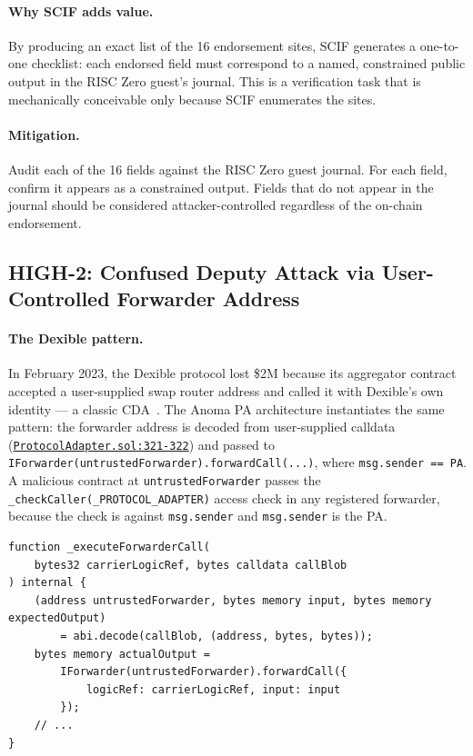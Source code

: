 \documentclass[11pt,a4paper]{article}
\newcommand{\paRepoRoot}{https://github.com/anoma/pa-evm/blob/main/contracts/src}
\newcommand{\parefR}[3]{\href{\paRepoRoot/#1\#L#2-L#3}{\nolinkurl{#1:#2-#3}}}
\begin{document}
\paragraph{Why SCIF adds value.} By producing an exact list of the 16
endorsement sites, SCIF generates a one-to-one checklist: each endorsed field
must correspond to a named, constrained public output in the RISC Zero guest's
journal. This is a verification task that is mechanically conceivable only
because SCIF enumerates the sites.

\paragraph{Mitigation.} Audit each of the 16 fields against the RISC Zero guest
journal. For each field, confirm it appears as a constrained output. Fields that
do not appear in the journal should be considered attacker-controlled regardless
of the on-chain endorsement.

\subsection{HIGH-2: Confused Deputy Attack via User-Controlled Forwarder Address}
\label{sec:high2}

\paragraph{The Dexible pattern.}
In February 2023, the Dexible protocol lost \$2M because its aggregator
contract accepted a user-supplied swap router address and called it with
Dexible's own identity --- a classic CDA~\cite{dexible2023}. The Anoma PA
architecture instantiates the same pattern: the forwarder address is decoded
from user-supplied calldata (\parefR{ProtocolAdapter.sol}{321}{322}) and passed
to \texttt{IForwarder(untrustedForwarder).forwardCall(...)}, where
\texttt{msg.sender == PA}. A malicious contract at \texttt{untrustedForwarder}
passes the \texttt{\_checkCaller(\_PROTOCOL\_ADAPTER)} access check in any
registered forwarder, because the check is against \texttt{msg.sender} and
\texttt{msg.sender} is the PA.

\begin{lstlisting}[style=soliditystyle,caption={\protect\parefR{ProtocolAdapter.sol}{320}{326}: forwarder decoded from calldata, no allowlist.}]
function _executeForwarderCall(
    bytes32 carrierLogicRef, bytes calldata callBlob
) internal {
    (address untrustedForwarder, bytes memory input, bytes memory expectedOutput)
        = abi.decode(callBlob, (address, bytes, bytes));
    bytes memory actualOutput =
        IForwarder(untrustedForwarder).forwardCall({
            logicRef: carrierLogicRef, input: input
        });
    // ...
}
\end{lstlisting}
\end{document}
